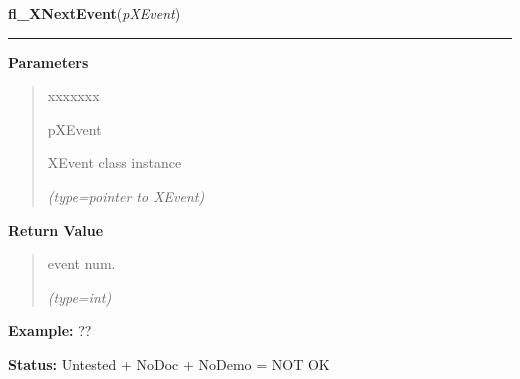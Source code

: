 \hspace{.8\funcindent}\begin{boxedminipage}{\funcwidth}

    \raggedright \textbf{fl\_XNextEvent}(\textit{pXEvent})

    \vspace{-1.5ex}

    \rule{\textwidth}{0.5\fboxrule}
\setlength{\parskip}{2ex}
\setlength{\parskip}{1ex}
      \textbf{Parameters}
      \vspace{-1ex}

      \begin{quote}
        \begin{Ventry}{xxxxxxx}

          \item[pXEvent]

          XEvent class instance

            {\it (type=pointer to XEvent)}

        \end{Ventry}

      \end{quote}

      \textbf{Return Value}
    \vspace{-1ex}

      \begin{quote}
      event num.

      {\it (type=int)}

      \end{quote}

\textbf{Example:} ??



\textbf{Status:} Untested + NoDoc + NoDemo = NOT OK



    \end{boxedminipage}

    \label{xformslib:flxbasic:fl_XPeekEvent}

    \vspace{0.5ex}

